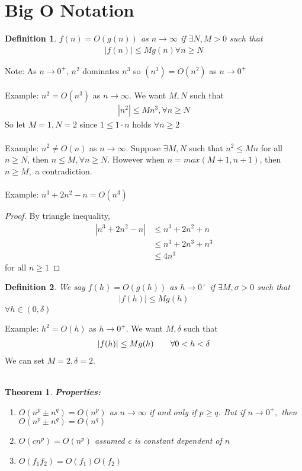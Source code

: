 \documentclass[11pt,oneside]{book}
\theoremstyle{break}
\theoremstyle{break}
\newtheorem{thm}{Theorem}[section]
\newtheorem{defn}{Definition}[corL]
\newcommand{\note}{\color{red}Note: \color{black}}
\newcommand{\example}{\color{purple}Example: \color{black}}
\begin{document}
	\section[Big O Notation]{Big O Notation}
	\begin{defn}
	$f(n)=O(g(n)) $ as $n\to \infty$ if $\exists N,M>0$ such that \begin{align*}
	|f(n)|\leq Mg(n)\forall n\geq N
	\end{align*}
	\end{defn}
	\note As $n\to 0^+$, $n^2$ dominates $n^3$ so $(n^3)=O(n^2)$ as $n\to 0^+$\\
	\hfill\\
	\example $n^2=O(n^3)$ as $n\to \infty.$ We want $M,N$ such that \begin{align*}
	|n^2|\leq Mn^3,\forall n\geq N
	\end{align*}
	So let $M=1,N=2$ since $1\leq 1\cdot n$ holds $\forall n\geq 2$\\
	\hfill\\
	\example $n^2\neq O(n)$ as $n\to \infty.$ Suppose $\exists M,N$ such that $n^2\leq Mn$ for all $n\geq N$, then $n\leq M,\forall n\geq N$. However when $n=max(M+1,n+1)$,  then $n\geq M,$ a contradiction.\\
	\hfill\\
	\example $n^3+2n^2-n=O(n^3)$\begin{proof}
	By triangle inequality, \begin{align*}
	|n^3+2n^2-n|&\leq n^3+2n^2+n\\
	&\leq n^3+2n^3+n^3\\
	&\leq 4n^3
	\end{align*}
	for all $n\geq 1$
	\end{proof}
	\begin{defn}
	We say $f(h)=O(g(h))$ as $h\to 0^+$ if $\exists M,\sigma >0$ such that \begin{align*}
	|f(h)|\leq Mg(h) 
	\end{align*}
	$\forall h\in (0,\delta)$
	\end{defn}
	\example $h^2=O(h)$ as $h\to 0^+$. We want $M,\delta $ such that \begin{align*}
	|f(h)|\leq Mg(h) \text{\qquad}\forall 0<h<\delta
	\end{align*}
We can set $M=2,\delta =2$.\\
\hfill\\
\begin{thm}
\textbf{Properties:}\begin{enumerate}
\item $O(n^p\pm n^q)=O(n^p)$ as $n\to \infty$ if and only if $p\geq q$. But if $n\to 0^+,$ then $O(n^p\pm n^q)=O(n^q)$
\item $O(cn^p)=O(n^p)$ assumed c is constant dependent of $n$
\item $O(f_1f_2)=O(f_1)O(f_2)$ 
\end{enumerate}
\end{thm}
\end{document}
